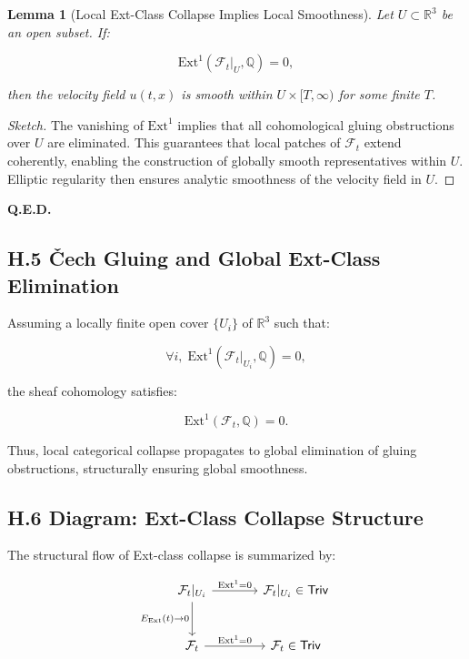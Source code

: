 \documentclass[11pt]{article}
\newtheorem{lemma}[theorem]{Lemma}
\begin{document}
\begin{lemma}[Local Ext-Class Collapse Implies Local Smoothness]
Let \( U \subset \mathbb{R}^3 \) be an open subset.  
If:

\[
\mathrm{Ext}^1(\mathcal{F}_t|_U, \mathbb{Q}) = 0,
\]

then the velocity field \( u(t, x) \) is smooth within \( U \times [T, \infty) \) for some finite \( T \).
\end{lemma}

\begin{proof}[Sketch]
The vanishing of \( \mathrm{Ext}^1 \) implies that all cohomological gluing obstructions over \( U \) are eliminated.  
This guarantees that local patches of \( \mathcal{F}_t \) extend coherently, enabling the construction of globally smooth representatives within \( U \).  
Elliptic regularity then ensures analytic smoothness of the velocity field in \( U \).
\end{proof}

\begin{flushright}
\textbf{Q.E.D.}
\end{flushright}

\subsection*{H.5 Čech Gluing and Global Ext-Class Elimination}

Assuming a locally finite open cover \( \{ U_i \} \) of \( \mathbb{R}^3 \) such that:

\[
\forall i, \; \mathrm{Ext}^1(\mathcal{F}_t|_{U_i}, \mathbb{Q}) = 0,
\]

the sheaf cohomology satisfies:

\[
\mathrm{Ext}^1(\mathcal{F}_t, \mathbb{Q}) = 0.
\]

Thus, local categorical collapse propagates to global elimination of gluing obstructions, structurally ensuring global smoothness.

\subsection*{H.6 Diagram: Ext-Class Collapse Structure}

The structural flow of Ext-class collapse is summarized by:

\[
\begin{tikzcd}[row sep=large, column sep=large]
\mathcal{F}_t|_{U_i}
  \arrow[r, "{\mathrm{Ext}^1 = 0}"]
  \arrow[d, "{E_{\mathrm{Ext}}(t) \to 0}"']
& \mathcal{F}_t|_{U_i} \in \mathsf{Triv} \\
\mathcal{F}_t
  \arrow[r, "{\mathrm{Ext}^1 = 0}"]
& \mathcal{F}_t \in \mathsf{Triv}
\end{tikzcd}
\]
\end{document}
